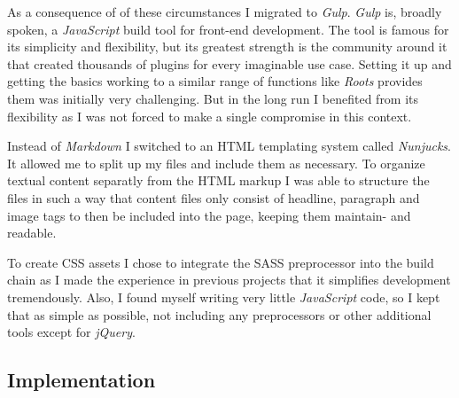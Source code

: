 As a consequence of of these circumstances I migrated to \textit{Gulp}. \textit{Gulp} is, broadly spoken, a \textit{JavaScript} build tool for front-end development. The tool is famous for its simplicity and flexibility, but its greatest strength is the community around it that created thousands of plugins for every imaginable use case. Setting it up and getting the basics working to a similar range of functions like \textit{Roots} provides them was initially very challenging. But in the long run I benefited from its flexibility as I was not forced to make a single compromise in this context.

Instead of \textit{Markdown} I switched to an \ac{HTML} templating system called \textit{Nunjucks}. It allowed me to split up my files and include them as necessary. To organize textual content separatly from the \ac{HTML} markup I was able to structure the files in such a way that content files only consist of headline, paragraph and image tags to then be included into the page, keeping them maintain- and readable.

To create \ac{CSS} assets I chose to integrate the \ac{SASS} preprocessor into the build chain as I made the experience in previous projects that it simplifies development tremendously. Also, I found myself writing very little \textit{JavaScript} code, so I kept that as simple as possible, not including any preprocessors or other additional tools except for \textit{jQuery}.

\subsection{Implementation}

